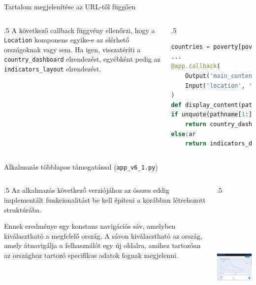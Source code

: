 \documentclass[english, aspectratio=169]{beamer}
\begin{document}
	\begin{frame}[fragile]{Tartalom megjelenítése az URL-től függően}
		\begin{columns}
			\begin{column}{.5\textwidth}
				A következő callback függvény ellenőrzi, hogy a \texttt{Location} komponens egyike-e az elérhető országoknak vagy sem. Ha igen, visszatéríti a \texttt{country\_dashboard} elrendezést, egyébként pedig az \texttt{indicators\_layout} elrendezést. 
			\end{column}
			\begin{column}{.5\textwidth}
				\begin{lstlisting}[language=python]
countries = poverty[poverty['is_country']]['Country Name'].drop_duplicates().sort_values().tolist()
...
@app.callback(
	Output('main_content', 'children'),
	Input('location', 'pathname')
)
def display_content(pathname):
if unquote(pathname[1:]) in countries:
	return country_dashboard
else:ar
	return indicators_dashboard
				\end{lstlisting}
			\end{column}
		\end{columns}
	\end{frame}
	
	\begin{frame}[fragile]{Alkalmazás többlapos támogatással (\texttt{app\_v6\_1.py})}
		\begin{columns}
			\begin{column}{.5\textwidth}
				Az alkalmazás következő verziójához az összes eddig implementált funkcionalitást be kell építeni a korábban létrehozott struktúrába.\par\smallskip
				Ennek eredménye egy konstans navigációs sáv, amelyben kiválasztható a megfelelő ország. A sávon kiválasztható az ország, amely átnavigálja a felhasználót egy új oldalra, amihez tartozóan az országhoz tartozó specifikus adatok fognak megjelenni.
			\end{column}
			\begin{column}{.5\textwidth}
				\begin{center}
					\includegraphics[width=7cm, height=7cm, keepaspectratio]{images/adv_7.png}
				\end{center}
			\end{column}
		\end{columns}
	\end{frame}
	
\end{document}
